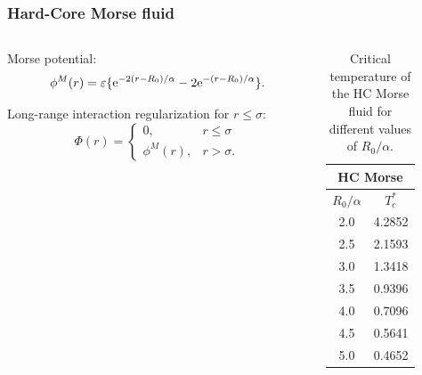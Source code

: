 \documentclass[8pt]{beamer}
\begin{document}
	\begin{frame}
		\frametitle{Hard-Core Morse fluid}
		
		\begin{columns}
			\begin{column}{0.5\textwidth}
				Morse potential:
				\begin{equation*}
					\phi^M(r) = \varepsilon \{{\rm e}^{-2(r-R_0)/\alpha}-2{\rm e}^{-(r-R_0)/\alpha}\}.
				\end{equation*}
				
				Long-range interaction regularization for $r \leq \sigma$:
				\begin{equation*}
					\Phi(r) = \left\{
					\begin{array}{ll}
						0, & r \leq \sigma 
						\\
						\phi^M(r), & r > \sigma.
					\end{array}
					\right.
				\end{equation*}
				
				
			\end{column}
			
			\begin{column}{0.5\textwidth}
				
				\begin{table}[h]
					\noindent\caption{Critical temperature of the HC Morse fluid for different values of $R_0/\alpha$.}\vskip3mm
					\begin{tabular}{|c|c|}
						\hline
						\multicolumn{2}{|c|}{HC Morse} \\
						\hline
						$R_0/\alpha$ \quad & $T_c^*$ \\
						\hline
						2.0  & 4.2852 \\
						2.5  & 2.1593 \\
						3.0  & 1.3418 \\
						3.5  & 0.9396 \\
						4.0  & 0.7096 \\
						4.5  & 0.5641 \\
						5.0  & 0.4652 \\
						\hline
					\end{tabular}
					\label{tab:morse_temp_cr}
				\end{table}
			\end{column}
		\end{columns}
		
	\end{frame}
	
\end{document}
